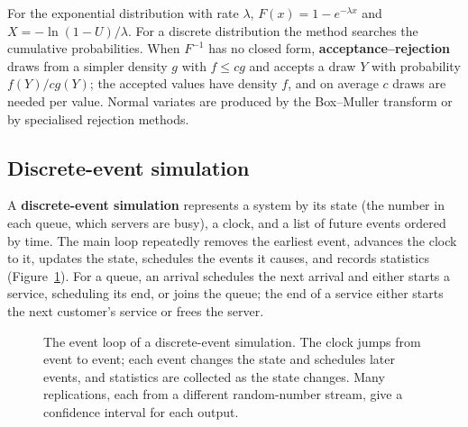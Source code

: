 \documentclass[11pt,a4paper]{article}
\numberwithin{equation}{section}
\theoremstyle{definition}
\begin{document}
For the exponential distribution with rate $\lambda$, $F(x) = 1 - e^{-\lambda x}$ and $X = -\ln(1 - U)/\lambda$. For a discrete distribution the method searches the cumulative probabilities. When $F^{-1}$ has no closed form, \textbf{acceptance--rejection} draws from a simpler density $g$ with $f \leq cg$ and accepts a draw $Y$ with probability $f(Y)/cg(Y)$; the accepted
values have density $f$, and on average $c$ draws are needed per value. Normal variates are produced by the Box--Muller transform or by specialised rejection methods.

\subsection{Discrete-event simulation}
\label{ssec:des}

A \textbf{discrete-event simulation} represents a system by its state (the number in each queue, which servers are busy), a clock, and a list of future events ordered by time. The main loop repeatedly removes the earliest event, advances the clock to it, updates the state, schedules the events it causes, and records statistics (Figure~\ref{fig:des}).
For a queue, an arrival schedules the next arrival and either starts a service, scheduling its end, or joins the queue; the end of a service either starts the next customer's service or frees the server.

\begin{figure}[H]
\centering
{}
\caption{The event loop of a discrete-event simulation. The clock jumps from event to event; each event changes the state and schedules later events, and statistics are collected as the state changes. Many replications, each from a different random-number stream, give a confidence interval for each output.}
\label{fig:des}
\end{figure}
\end{document}

